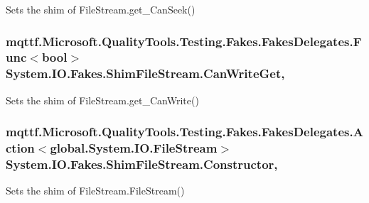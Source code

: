 Sets the shim of File\-Stream.\-get\-\_\-\-Can\-Seek()

\hypertarget{class_system_1_1_i_o_1_1_fakes_1_1_shim_file_stream_a03f6ea8b91e9ee19468de7db6de8c439}{
\subsubsection[{Can\-Write\-Get}]{\setlength{\rightskip}{0pt plus 5cm}mqttf.\-Microsoft.\-Quality\-Tools.\-Testing.\-Fakes.\-Fakes\-Delegates.\-Func$<$bool$>$ System.\-I\-O.\-Fakes.\-Shim\-File\-Stream.\-Can\-Write\-Get\hspace{0.3cm}{\ttfamily [get]}, {\ttfamily [set]}}}\label{class_system_1_1_i_o_1_1_fakes_1_1_shim_file_stream_a03f6ea8b91e9ee19468de7db6de8c439}


Sets the shim of File\-Stream.\-get\-\_\-\-Can\-Write()

\hypertarget{class_system_1_1_i_o_1_1_fakes_1_1_shim_file_stream_a4e55bb67dd9c03dd870ec5ffb21b1e74}{
\subsubsection[{Constructor}]{\setlength{\rightskip}{0pt plus 5cm}mqttf.\-Microsoft.\-Quality\-Tools.\-Testing.\-Fakes.\-Fakes\-Delegates.\-Action$<$global.\-System.\-I\-O.\-File\-Stream$>$ System.\-I\-O.\-Fakes.\-Shim\-File\-Stream.\-Constructor\hspace{0.3cm}{\ttfamily [static]}, {\ttfamily [set]}}}\label{class_system_1_1_i_o_1_1_fakes_1_1_shim_file_stream_a4e55bb67dd9c03dd870ec5ffb21b1e74}


Sets the shim of File\-Stream.\-File\-Stream()

